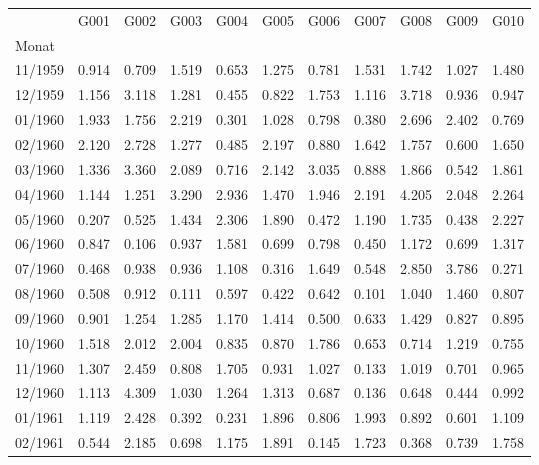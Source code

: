 \begin{tabular}{lrrrrrrrrrr}
\toprule
{} &   G001 &   G002 &   G003 &   G004 &   G005 &   G006 &   G007 &   G008 &   G009 &   G010 \\
Monat   &        &        &        &        &        &        &        &        &        &        \\
\midrule
11/1959 &  0.914 &  0.709 &  1.519 &  0.653 &  1.275 &  0.781 &  1.531 &  1.742 &  1.027 &  1.480 \\
12/1959 &  1.156 &  3.118 &  1.281 &  0.455 &  0.822 &  1.753 &  1.116 &  3.718 &  0.936 &  0.947 \\
01/1960 &  1.933 &  1.756 &  2.219 &  0.301 &  1.028 &  0.798 &  0.380 &  2.696 &  2.402 &  0.769 \\
02/1960 &  2.120 &  2.728 &  1.277 &  0.485 &  2.197 &  0.880 &  1.642 &  1.757 &  0.600 &  1.650 \\
03/1960 &  1.336 &  3.360 &  2.089 &  0.716 &  2.142 &  3.035 &  0.888 &  1.866 &  0.542 &  1.861 \\
04/1960 &  1.144 &  1.251 &  3.290 &  2.936 &  1.470 &  1.946 &  2.191 &  4.205 &  2.048 &  2.264 \\
05/1960 &  0.207 &  0.525 &  1.434 &  2.306 &  1.890 &  0.472 &  1.190 &  1.735 &  0.438 &  2.227 \\
06/1960 &  0.847 &  0.106 &  0.937 &  1.581 &  0.699 &  0.798 &  0.450 &  1.172 &  0.699 &  1.317 \\
07/1960 &  0.468 &  0.938 &  0.936 &  1.108 &  0.316 &  1.649 &  0.548 &  2.850 &  3.786 &  0.271 \\
08/1960 &  0.508 &  0.912 &  0.111 &  0.597 &  0.422 &  0.642 &  0.101 &  1.040 &  1.460 &  0.807 \\
09/1960 &  0.901 &  1.254 &  1.285 &  1.170 &  1.414 &  0.500 &  0.633 &  1.429 &  0.827 &  0.895 \\
10/1960 &  1.518 &  2.012 &  2.004 &  0.835 &  0.870 &  1.786 &  0.653 &  0.714 &  1.219 &  0.755 \\
11/1960 &  1.307 &  2.459 &  0.808 &  1.705 &  0.931 &  1.027 &  0.133 &  1.019 &  0.701 &  0.965 \\
12/1960 &  1.113 &  4.309 &  1.030 &  1.264 &  1.313 &  0.687 &  0.136 &  0.648 &  0.444 &  0.992 \\
01/1961 &  1.119 &  2.428 &  0.392 &  0.231 &  1.896 &  0.806 &  1.993 &  0.892 &  0.601 &  1.109 \\
02/1961 &  0.544 &  2.185 &  0.698 &  1.175 &  1.891 &  0.145 &  1.723 &  0.368 &  0.739 &  1.758 \\

\end{tabular}
